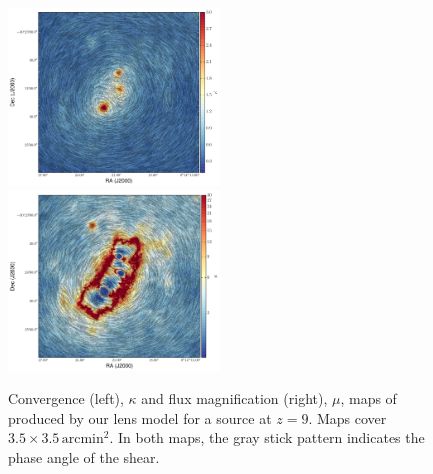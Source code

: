 \begin{figure}
    \includegraphics[width=0.5\textwidth]{fig/kappaplanck.pdf}
    \includegraphics[width=0.5\textwidth]{fig/magplanck.pdf}
    \caption[Convergence and magnification of our lens model.]{Convergence (left), $\kappa$ and flux magnification (right), $\mu$, maps of \cler produced by our
    lens model for a source at $z=9$. Maps cover $3.5 \times 3.5 \, \textrm{arcmin}^2$. In both maps, the gray
    stick pattern indicates the phase angle of the shear. \label{fig:lens_maps}}
\end{figure}

